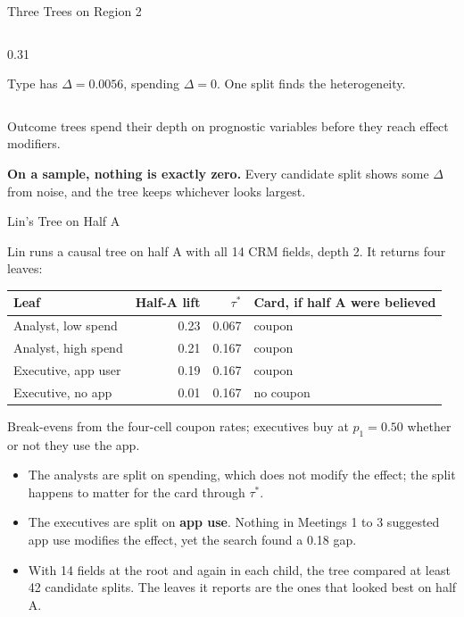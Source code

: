 \documentclass[aspectratio=169, 11pt, handout]{beamer}
\begin{document}
\begin{frame}{Three Trees on Region 2}
\begin{columns}[T]
\begin{column}{0.31\textwidth}
\vspace{0.3em}
\raggedright\footnotesize Type has $\Delta = 0.0056$, spending $\Delta = 0$. One split finds the heterogeneity.
\end{column}
\end{columns}

\bigskip

Outcome trees spend their depth on prognostic variables before they reach effect modifiers.

\smallskip

\textbf{On a sample, nothing is exactly zero.} Every candidate split shows some $\Delta$ from noise, and the tree keeps whichever looks largest.
\end{frame}

\begin{frame}{Lin's Tree on Half A}

Lin runs a causal tree on half A with all 14 CRM fields, depth 2. It returns four leaves:

\begin{center}
\small
\begin{tabular}{lrrl}
\toprule
\textbf{Leaf} & \textbf{Half-A lift} & $\tau^\ast$ & \textbf{Card, if half A were believed} \\
\midrule
Analyst, low spend & 0.23 & 0.067 & coupon \\
Analyst, high spend & 0.21 & 0.167 & coupon \\
Executive, app user & 0.19 & 0.167 & \textcolor{warnred}{coupon} \\
Executive, no app & 0.01 & 0.167 & no coupon \\
\bottomrule
\end{tabular}
\end{center}

\small Break-evens from the four-cell coupon rates; executives buy at $p_1 = 0.50$ whether or not they use the app.

\normalsize
\bigskip

\begin{itemize}
  \item The analysts are split on spending, which does not modify the effect; the split happens to matter for the card through $\tau^\ast$.
  \item The executives are split on \textbf{app use}. Nothing in Meetings 1 to 3 suggested app use modifies the effect, yet the search found a 0.18 gap.
  \item With 14 fields at the root and again in each child, the tree compared at least 42 candidate splits. The leaves it reports are the ones that looked best on half A.
\end{itemize}
\end{frame}
\end{document}
